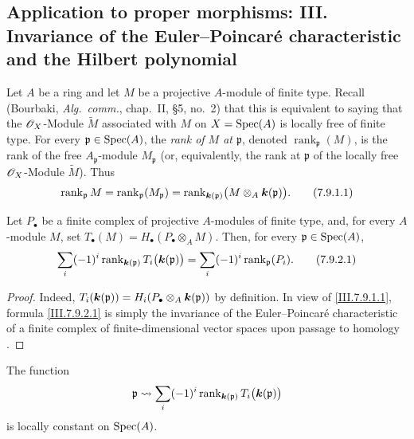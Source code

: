\subsection{Application to proper morphisms: III. Invariance of the
Euler--Poincar\'e characteristic and the Hilbert polynomial}
\label{subsection:III.7.9}
\label{III.7.9}

\begin{env}[7.9.1]
\label{III.7.9.1}
Let $A$ be a ring and let $M$ be a projective $A$-module of
finite type.  Recall (Bourbaki, \emph{Alg.~comm.}, chap.~II,
\S5, no.~2) that this is equivalent to saying that the
$\mathscr{O}_X$-Module $\widetilde M$ associated with $M$ on
$X=\operatorname{Spec}(A)$ is locally free of finite type.  For every
$\mathfrak p\in\operatorname{Spec}(A)$, the \emph{rank of $M$ at
$\mathfrak p$}, denoted $\operatorname{rank}_{\mathfrak p}(M)$,
is the rank of the free $A_{\mathfrak p}$-module
$M_{\mathfrak p}$ (or, equivalently, the rank at
$\mathfrak p$ of the locally free $\mathscr{O}_X$-Module
$\widetilde M$).  Thus
\[
  \operatorname{rank}_{\mathfrak p}M
  =
  \operatorname{rank}_{\mathfrak p}(M_{\mathfrak p})
  =
  \operatorname{rank}_{\boldsymbol{k}(\mathfrak p)}
    \bigl(M\otimes_A\boldsymbol{k}(\mathfrak p)\bigr).
  \tag{7.9.1.1}\label{III.7.9.1.1}
\]
\end{env}

\begin{proposition}[7.9.2]
\label{III.7.9.2}
Let $P_\bullet$ be a finite complex of projective $A$-modules
of finite type, and, for every $A$-module $M$, set $T_\bullet(M)=H_\bullet(P_\bullet\otimes_A M)$.
Then, for every $\mathfrak p\in\operatorname{Spec}(A)$,
\[
  \sum_i(- 1)^i
    \operatorname{rank}_{\boldsymbol{k}(\mathfrak p)}
      T_i\bigl(\boldsymbol{k}(\mathfrak p)\bigr)
  =
  \sum_i(- 1)^i\operatorname{rank}_{\mathfrak p}(P_i).
  \tag{7.9.2.1}\label{III.7.9.2.1}
\]
\end{proposition}

\begin{proof}
Indeed,
$T_i(\boldsymbol{k}(\mathfrak p))
 =H_i(P_\bullet\otimes_A\boldsymbol{k}(\mathfrak p))$ by definition.
In view of \eqref{III.7.9.1.1}, formula
\eqref{III.7.9.2.1} is simply the invariance of the
Euler--Poincar\'e characteristic of a finite complex of
finite-dimensional vector spaces upon passage to homology
.
\end{proof}

\begin{corollary}[7.9.3]
\label{III.7.9.3}
The function
\[
  \mathfrak p\leadsto
  \sum_i(-1)^i
    \operatorname{rank}_{\boldsymbol{k}(\mathfrak p)}
      T_i\bigl(\boldsymbol{k}(\mathfrak p)\bigr)
\]
is locally constant on $\operatorname{Spec}(A)$.
\end{corollary}

